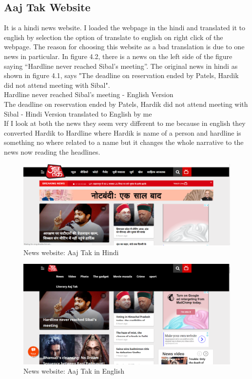 \documentclass[12pt]{report}
\begin{document}
\subsection{Aaj Tak Website}
It is a hindi news website. I loaded the webpage in the hindi and translated it to english by selection the option of translate to english on right click of the webpage. The reason for choosing this website as a bad translation is due to one news in particular. In figure 4.2, there is a news on the left side of the figure saying ``Hardline never reached Sibal's meeting''. The original news in hindi as shown in figure 4.1, says "The deadline on reservation ended by Patels, Hardik did not attend meeting with Sibal".   \\ 
 Hardline never reached Sibal's meeting - English Version\\
The deadline on reservation ended by Patels, Hardik did not attend meeting with Sibal - Hindi Version translated to English by me\\
If I look at both the news they seem very different to me because in english they converted Hardik to Hardline where Hardik is name of a person and hardline is something no where related to a name but it changes the whole narrative to the news now reading the headlines.  
\begin{figure}[ht]
  \centering
  \includegraphics[width=1\textwidth]{Problem6_9/AajTak_Hindi.PNG}
  \caption{News website: Aaj Tak in Hindi}
  \label{fig:5}
\end{figure}

\begin{figure}[ht]
  \centering
  \includegraphics[width=1\textwidth]{Problem6_9/AajTak_English.PNG}
  \caption{News website: Aaj Tak in English}
  \label{fig:4}
\end{figure} 
\end{document}
